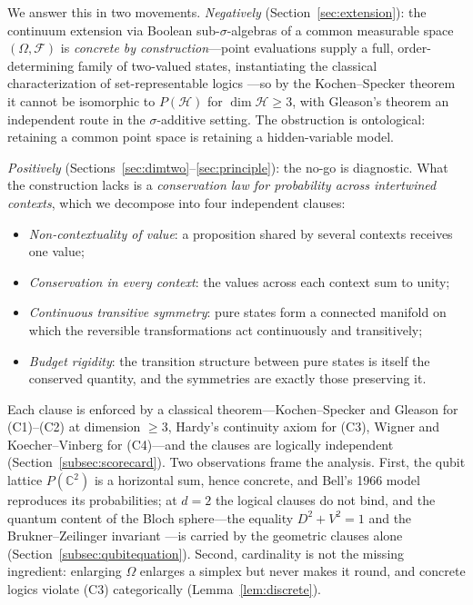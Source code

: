 \documentclass[11pt]{article}
\theoremstyle{definition}
\theoremstyle{remark}
\newcommand{\Hi}{\mathcal{H}}
\newcommand{\PH}{P(\Hi)}
\newcommand{\F}{\mathcal{F}}
\newcommand{\Om}{\Omega}
\begin{document}
We answer this in two movements. \emph{Negatively}
(Section~\ref{sec:extension}): the continuum extension via Boolean
sub-$\sigma$-algebras of a common measurable space $(\Om,\F)$ is
\emph{concrete by construction}---point evaluations supply a full,
order-determining family of two-valued states, instantiating the
classical characterization of set-representable logics
\cite{Gudder1988,PtakPulmannova1991}---so by the Kochen--Specker theorem
\cite{KochenSpecker1967} it cannot be isomorphic to $\PH$ for
$\dim\Hi\ge 3$, with Gleason's theorem \cite{Gleason1957} an independent
route in the $\sigma$-additive setting. The obstruction is ontological:
retaining a common point space is retaining a hidden-variable model.

\emph{Positively} (Sections~\ref{sec:dimtwo}--\ref{sec:principle}): the
no-go is diagnostic. What the construction lacks is a \emph{conservation
law for probability across intertwined contexts}, which we decompose
into four independent clauses:
\begin{itemize}
\item[\textbf{(C1)}] \emph{Non-contextuality of value}: a proposition
shared by several contexts receives one value;
\item[\textbf{(C2)}] \emph{Conservation in every context}: the values
across each context sum to unity;
\item[\textbf{(C3)}] \emph{Continuous transitive symmetry}: pure states
form a connected manifold on which the reversible transformations act
continuously and transitively;
\item[\textbf{(C4)}] \emph{Budget rigidity}: the transition structure
between pure states is itself the conserved quantity, and the symmetries
are exactly those preserving it.
\end{itemize}
Each clause is enforced by a classical theorem---Kochen--Specker and
Gleason for (C1)--(C2) at dimension $\geq 3$, Hardy's continuity axiom
for (C3), Wigner and Koecher--Vinberg for (C4)---and the clauses are
logically independent (Section~\ref{subsec:scorecard}). Two observations
frame the analysis. First, the qubit lattice $P(\mathbb{C}^{2})$ is a
horizontal sum, hence concrete, and Bell's 1966 model \cite{Bell1966}
reproduces its probabilities; at $d=2$ the logical clauses do not bind,
and the quantum content of the Bloch sphere---the equality $D^2+V^2=1$
\cite{GreenbergerYasin1988,JaegerShimonyVaidman1995,Englert1996} and the
Brukner--Zeilinger invariant \cite{BruknerZeilinger1999,Zeilinger1999}---is
carried by the geometric clauses alone
(Section~\ref{subsec:qubitequation}). Second, cardinality is not the
missing ingredient: enlarging $\Om$ enlarges a simplex but never makes
it round, and concrete logics violate (C3) categorically
(Lemma~\ref{lem:discrete}).
\end{document}
